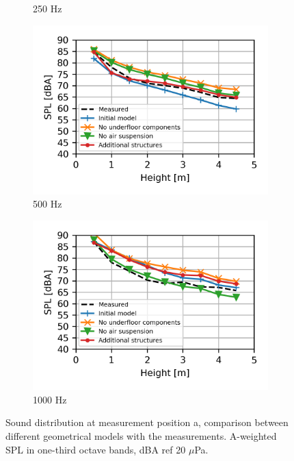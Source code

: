 \begin{figure}[H]
\begin{subfigure}[b]{0.49\textwidth}
		\caption{250 Hz}
	\end{subfigure}
	\begin{subfigure}[b]{0.49\textwidth}
		\centering
		\includegraphics{fig/chap5/geometry_variation/third_octave_over_height/500_Hz.png}
		\caption{500 Hz}
	\end{subfigure}
	\begin{subfigure}[b]{0.49\textwidth}
		\centering
		\includegraphics{fig/chap5/geometry_variation/third_octave_over_height/1000_Hz.png}
		\caption{1000 Hz}
	\end{subfigure}
	\caption{Sound distribution at measurement position a, comparison between different geometrical models with the measurements. A-weighted SPL in one-third octave bands, dBA ref 20 $\mu$Pa.}
	\label{fig:third_octave_over_height_geometry_variation}
\end{figure}

